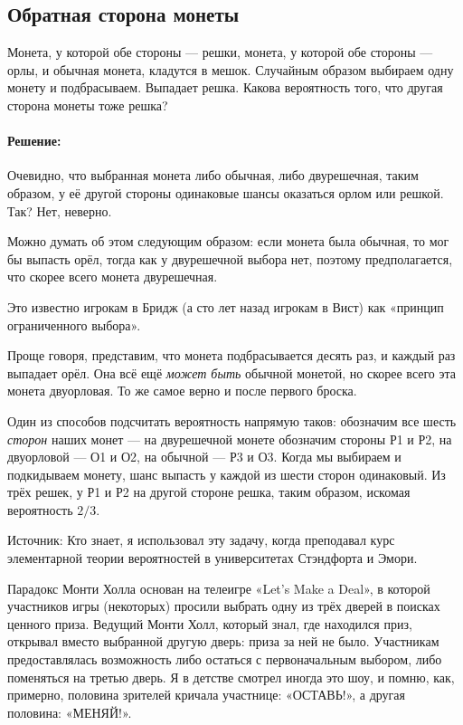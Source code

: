 \subsection*{Обратная сторона монеты}%

Монета, у которой обе стороны --- решки, монета, у которой обе стороны --- орлы, и обычная монета, кладутся в мешок.
Случайным образом выбираем одну монету и подбрасываем.
Выпадает решка.
Какова вероятность того, что другая сторона монеты тоже решка?

\paragraph{Решение:}
Очевидно, что выбранная монета либо обычная, либо двурешечная, таким образом, у её другой стороны одинаковые шансы оказаться орлом или решкой.
Так?
Нет, неверно.

Можно думать об этом следующим образом: если монета была обычная, то мог бы выпасть орёл, тогда как у двурешечной выбора нет, поэтому предполагается, что скорее всего монета двурешечная.

Это известно игрокам в Бридж (а сто лет назад игрокам в Вист) как «принцип ограниченного выбора».

Проще говоря, представим, что монета подбрасывается десять раз, и каждый раз выпадает орёл.
Она всё ещё \emph{может быть} обычной монетой, но скорее всего эта монета двуорловая.
То же самое верно и после первого броска.

Один из способов подсчитать вероятность напрямую таков:
обозначим все шесть \emph{сторон} наших монет ---
на двурешечной монете обозначим стороны Р1 и Р2, на двуорловой --- О1 и О2, на обычной --- Р3 и О3.
Когда мы выбираем и подкидываем монету, шанс выпасть у каждой из шести сторон одинаковый.
Из трёх решек, у Р1 и Р2 на другой стороне решка, таким образом, искомая вероятность $2/3$.\heart

Источник: Кто знает, я использовал эту задачу, когда преподавал курс элементарной теории вероятностей в университетах Стэндфорта и Эмори.

\medskip

Парадокс Монти Холла основан на телеигре «Let’s Make a Deal», в которой участников игры (некоторых) просили выбрать одну из трёх дверей в поисках ценного приза.
Ведущий Монти Холл, который знал, где находился приз, открывал вместо выбранной другую дверь: приза за ней не было.
Участникам предоставлялась возможность либо остаться с первоначальным выбором, либо поменяться на третью дверь.
Я в детстве смотрел иногда это шоу, и помню, как, примерно, половина зрителей кричала участнице: «ОСТАВЬ!», а другая половина: «МЕНЯЙ!».


